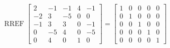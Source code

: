 \begin{exerciseAnswer} 


\[\operatorname{RREF} \left[\begin{array}{ccccc}
2 & -1 & -1 & 4 & -1 \\
-2 & 3 & -5 & 0 & 0 \\
-1 & 3 & 3 & 0 & -1 \\
0 & -5 & 4 & 0 & -5 \\
0 & 4 & 0 & 1 & 0
\end{array}\right] = \left[\begin{array}{ccccc}
1 & 0 & 0 & 0 & 0 \\
0 & 1 & 0 & 0 & 0 \\
0 & 0 & 1 & 0 & 0 \\
0 & 0 & 0 & 1 & 0 \\
0 & 0 & 0 & 0 & 1
\end{array}\right] \]



\end{exerciseAnswer}
